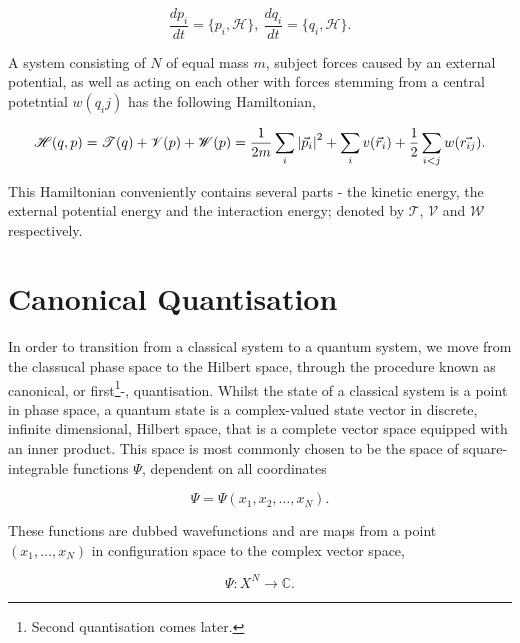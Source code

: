     \begin{equation}
        \frac{dp_i}{dt} = \{p_i, \mathscr{H}\}, \ \frac{dq_i}{dt} = \{q_i, \mathscr{H}\}.
    \end{equation}

    A system consisting of $N$ of equal mass $m$, subject forces caused by an external
    potential, as well as acting on each other with forces stemming from a central
    potetntial $w(q_ij)$ has the following Hamiltonian,

    \begin{equation}
        \mathscr{H}(q, p) = \mathscr{T}(q) + \mathscr{V}(p) + \mathscr{W}(p) 
            = \frac{1}{2m}\sum_{i} \abs{\vec{p}_i}^2 + \sum_{i} v(\vec{r}_i)
                + \frac{1}{2}\sum_{i<j} w(\vec{r_{ij}}).
    \end{equation}

    This Hamiltonian conveniently contains several parts - the kinetic energy, the
    external potential energy and the interaction energy; denoted by $\mathscr{T}$,
    $\mathscr{V}$ and $\mathscr{W}$ respectively.

\section{Canonical Quantisation}

    In order to transition from a classical system to a quantum system, we move from 
    the classucal phase space to the Hilbert space, through the procedure known as 
    canonical, or first\footnote{Second quantisation comes later.}-, quantisation.
    Whilst the state of a classical system is a point in phase space, a quantum state
    is a complex-valued state vector in discrete, infinite dimensional, Hilbert space,
    that is a complete vector space equipped with an inner product. This space
    is most commonly chosen to be the space of square-integrable functions $\Psi$,
    dependent on all coordinates
    
    \begin{equation}
        \Psi = \Psi(x_1, x_2, \dots, x_N).
    \end{equation}
    
    These functions
    are dubbed wavefunctions and are maps from a point $(x_1, \dots, x_N)$ in
    configuration space to the complex vector space,

    \begin{equation}
        \Psi: X^N \to \mathds{C}.
    \end{equation}

